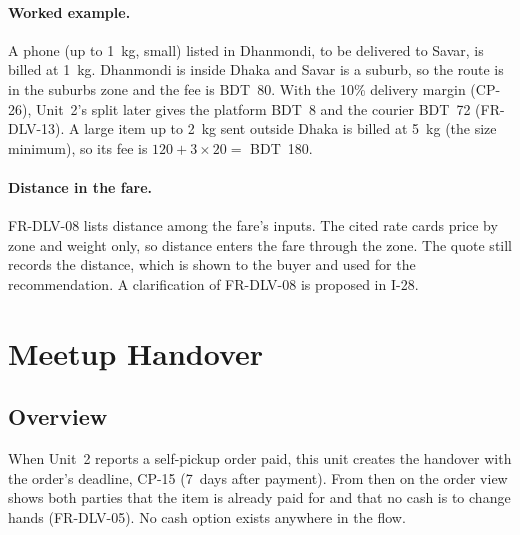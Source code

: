 \documentclass[11pt,a4paper]{article}
\begin{document}
\paragraph{Worked example.} A phone (up to 1~kg, small) listed in Dhanmondi, to be delivered to Savar, is billed at 1~kg. Dhanmondi is inside Dhaka and Savar is a suburb, so the route is in the suburbs zone and the fee is BDT~80. With the 10\% delivery margin (CP-26), Unit~2's split later gives the platform BDT~8 and the courier BDT~72 (FR-DLV-13). A large item up to 2~kg sent outside Dhaka is billed at 5~kg (the size minimum), so its fee is $120 + 3 \times 20 = $ BDT~180.

\paragraph{Distance in the fare.} FR-DLV-08 lists distance among the fare's inputs. The cited rate cards price by zone and weight only, so distance enters the fare through the zone. The quote still records the distance, which is shown to the buyer and used for the recommendation. A clarification of FR-DLV-08 is proposed in I-28.
\section{Meetup Handover}
\label{sec:meetup}

\subsection{Overview}
When Unit~2 reports a self-pickup order paid, this unit creates the handover with the order's deadline, CP-15 (7~days after payment). From then on the order view shows both parties that the item is already paid for and that no cash is to change hands (FR-DLV-05). No cash option exists anywhere in the flow.
\end{document}
